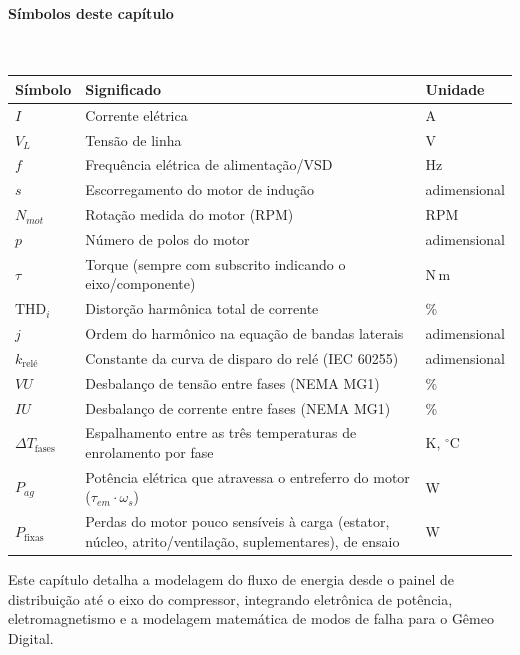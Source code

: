 \documentclass[12pt,a4paper]{article}
\numberwithin{equation}{section}
\numberwithin{table}{section}
\numberwithin{figure}{section}
\begin{document}
{\paragraph{Símbolos deste capítulo}\mbox{}\\[-0.5em]
{\small
\begin{longtable}{>{\raggedright\arraybackslash}p{2.6cm} >{\raggedright\arraybackslash}p{9.2cm} >{\raggedright\arraybackslash}p{2.6cm}}
	\toprule
	\textbf{Símbolo} & \textbf{Significado} & \textbf{Unidade} \\ \midrule
	\endhead
	$I$ & Corrente elétrica & A \\
	$V_L$ & Tensão de linha & V \\
	$f$ & Frequência elétrica de alimentação/VSD & Hz \\
	$s$ & Escorregamento do motor de indução & adimensional \\
	$N_{mot}$\dag & Rotação medida do motor (RPM) & RPM \\
	$p$ & Número de polos do motor & adimensional \\
	$\tau$ & Torque (sempre com subscrito indicando o eixo/componente) & N\,m \\
	$\text{THD}_i$ & Distorção harmônica total de corrente & \% \\
	$j$\dag & Ordem do harmônico na equação de bandas laterais & adimensional \\
	$k_{\text{relé}}$\dag & Constante da curva de disparo do relé (IEC 60255) & adimensional \\
	$VU$ & Desbalanço de tensão entre fases (NEMA MG1) & \% \\
	$IU$ & Desbalanço de corrente entre fases (NEMA MG1) & \% \\
	$\Delta T_{\text{fases}}$ & Espalhamento entre as três temperaturas de enrolamento por fase & K, $^{\circ}$C \\
	$P_{ag}$ & Potência elétrica que atravessa o entreferro do motor ($\tau_{em}\cdot\omega_s$) & W \\
	$P_{\text{fixas}}$ & Perdas do motor pouco sensíveis à carga (estator, núcleo, atrito/ventilação, suplementares), de ensaio & W \\
	\bottomrule
\end{longtable}
}




	
	Este capítulo detalha a modelagem do fluxo de energia desde o painel de distribuição até o eixo do compressor, integrando eletrônica de potência, eletromagnetismo e a modelagem matemática de modos de falha para o Gêmeo Digital.
	
}
\end{document}
